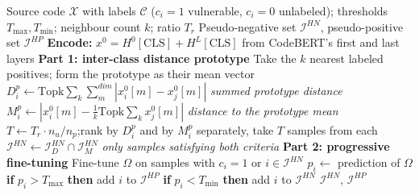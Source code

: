 \documentclass{article}
\begin{document}
\begin{algorithm}[!h]
\renewcommand{\algorithmicrequire}{\textbf{Input:}}
\renewcommand{\algorithmicensure}{\textbf{Output:}}
	\caption{PILOT: distance-aware label selection for PU vulnerability detection}
	\begin{algorithmic}[1]
	    \REQUIRE
	    Source code $\mathcal{X}$ with labels $\mathcal{C}$ ($c_{i}=1$ vulnerable, $c_{i}=0$ unlabeled);
	    thresholds $T_{\max},T_{\min}$; neighbour count $k$; ratio $T_{r}$
	    \ENSURE
	    Pseudo-negative set $\mathcal{I}^{HN}$, pseudo-positive set $\mathcal{I}^{HP}$
	    \STATE \textbf{Encode:} $x^{0}=H^{0}[\mathrm{CLS}]+H^{L}[\mathrm{CLS}]$ from CodeBERT's
	    first and last layers %
	    \STATE \textbf{Part 1: inter-class distance prototype}
	    \STATE Take the $k$ nearest labeled positives; form the prototype as their mean vector
	    \STATE $D_{i}^{p}\leftarrow \mathrm{Topk}\sum_{k}\sum_{m}^{dim}\left|x_{i}^{0}[m]-x_{j}^{0}[m]\right|$
	    \hfill \emph{summed prototype distance} %
	    \STATE $M_{i}^{p}\leftarrow \left|x_{i}^{0}[m]-\tfrac{1}{k}\mathrm{Topk}\sum_{k}x_{j}^{0}[m]\right|$
	    \hfill \emph{distance to the prototype mean} %
	    \ENDFOR
	    \STATE $T\leftarrow T_{r}\cdot n_{u}/n_{p}$;\quad rank by $D_{i}^{p}$ and by $M_{i}^{p}$
	    separately, take $T$ samples from each
	    \STATE $\mathcal{I}^{HN}\leftarrow \mathcal{I}_{D}^{HN}\cap\mathcal{I}_{M}^{HN}$
	    \hfill \emph{only samples satisfying \emph{both} criteria} %
	    \STATE \textbf{Part 2: progressive fine-tuning}
	    \STATE Fine-tune $\Omega$ on samples with $c_{i}=1$ or $i\in\mathcal{I}^{HN}$ %
	    \STATE $p_{i}\leftarrow$ prediction of $\Omega$
	    \STATE \textbf{if} $p_{i}>T_{\max}$ \textbf{then} add $i$ to $\mathcal{I}^{HP}$ %
	    \STATE \textbf{if} $p_{i}<T_{\min}$ \textbf{then} add $i$ to $\mathcal{I}^{HN}$ %
	    \ENDFOR
	    \ENDFOR
		\RETURN $\mathcal{I}^{HN}$, $\mathcal{I}^{HP}$
	\end{algorithmic}
\end{algorithm}
\end{document}
